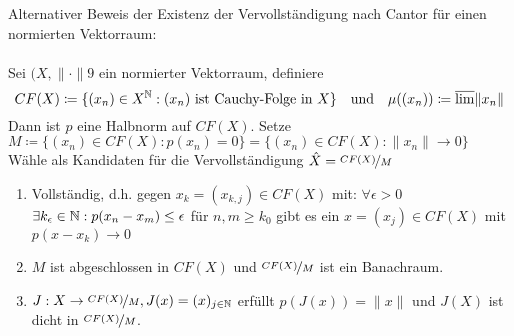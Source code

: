 \begin{bemerkung}
Alternativer Beweis der Existenz der Vervollständigung nach Cantor für einen normierten Vektorraum: \\ \\
	Sei $(X, \| \cdot \|9$ ein normierter Vektorraum, definiere 
	\[ CF(X) \coloneqq \{ (x_{n}) \in X^{\mathbb{N}}: (x_{n}) \text{ ist Cauchy-Folge in } X \} \quad \text{und} \quad \mu((x_{n})) \coloneqq \overline{\lim} \| x_{n} \| \]
	Dann ist $p$ eine Halbnorm auf $CF(X)$. Setze $M \coloneqq \{(x_{n}) \in CF(X): p(x_{n}) = 0 \} = \{ (x_{n}) \in CF(X): \| x_{n} \| \rightarrow 0 \}$
	Wähle als Kandidaten für die Vervollständigung $\hat X = \nicefrac{CF(X)}{M}$
	\begin{enumerate}[label=\roman*\upshape)]
		\item Vollständig, d.h. gegen $x_{k} = (x_{k, j}) \in CF(X)$ mit: $\forall \epsilon > 0$ $\exists k_{\epsilon} \in \mathbb{N}: p(x_{n} - x_{m}) \leq \epsilon$ für $n, m \geq k_{0}$ gibt es ein $x = (x_{j}) \in CF(X)$ mit $p(x - x_{k}) \rightarrow 0$
		\item $M$ ist abgeschlossen in $CF(X)$ und $\nicefrac{CF(X)}{M}$ ist ein Banachraum.
		\item $J: X \rightarrow \nicefrac{CF(X)}{M}, J(x) = (x)_{j \in \mathbb{N}}$ erfüllt $p\left(J(x)\right) = \| x \|$ und $J(X)$ ist dicht in $\nicefrac{CF(X)}{M}$.
	\end{enumerate} 
\end{bemerkung}

